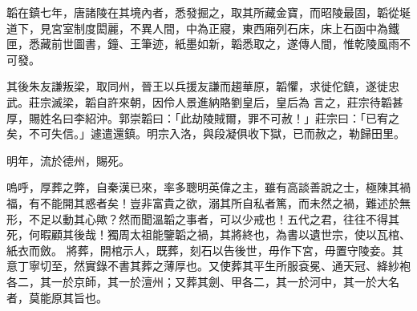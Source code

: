 \begin{pinyinscope}
 韜在鎮七年，唐諸陵在其境內者，悉發掘之，取其所藏金寶，而昭陵最固，韜從埏道下，見宮室制度閎麗，不異人間，中為正寢，東西廂列石床，床上石函中為鐵匣，悉藏前世圖書，鐘、王筆迹，紙墨如新，韜悉取之，遂傳人間，惟乾陵風雨不可發。



 其後朱友謙叛梁，取同州，晉王以兵援友謙而趨華原，韜懼，求徙佗鎮，遂徙忠武。莊宗滅梁，韜自許來朝，因伶人景進納賂劉皇后，皇后為
 言之，莊宗待韜甚厚，賜姓名曰李紹沖。郭崇韜曰：「此劫陵賊爾，罪不可赦！」莊宗曰：「已宥之矣，不可失信。」遽遣還鎮。明宗入洛，與段凝俱收下獄，已而赦之，勒歸田里。



 明年，流於德州，賜死。



 嗚呼，厚葬之弊，自秦漢已來，率多聰明英偉之主，雖有高談善說之士，極陳其禍福，有不能開其惑者矣！豈非富貴之欲，溺其所自私者篤，而未然之禍，難述於無形，不足以動其心歟？然而聞溫韜之事者，可以少戒也！五代之君，往往不得其死，何暇顧其後哉！獨周太祖能鑒韜之禍，其將終也，為書以遺世宗，使以瓦棺、紙衣而斂。
 將葬，開棺示人，既葬，刻石以告後世，毋作下宮，毋置守陵妾。其意丁寧切至，然實錄不書其葬之薄厚也。又使葬其平生所服袞冕、通天冠、絳紗袍各二，其一於京師，其一於澶州；又葬其劍、甲各二，其一於河中，其一於大名者，莫能原其旨也。



\end{pinyinscope}
